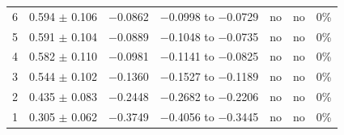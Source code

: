 \begin{table}[t]
\begin{tabular}{rcccccc}
6 & 0.594 $\pm$ 0.106 & $-$0.0862 & $-$0.0998 to $-$0.0729 & no & no & 0\% \\
5 & 0.591 $\pm$ 0.104 & $-$0.0889 & $-$0.1048 to $-$0.0735 & no & no & 0\% \\
4 & 0.582 $\pm$ 0.110 & $-$0.0981 & $-$0.1141 to $-$0.0825 & no & no & 0\% \\
3 & 0.544 $\pm$ 0.102 & $-$0.1360 & $-$0.1527 to $-$0.1189 & no & no & 0\% \\
2 & 0.435 $\pm$ 0.083 & $-$0.2448 & $-$0.2682 to $-$0.2206 & no & no & 0\% \\
1 & 0.305 $\pm$ 0.062 & $-$0.3749 & $-$0.4056 to $-$0.3445 & no & no & 0\% \\
\bottomrule
\end{tabular}
\par\smallskip\parbox{0.95\linewidth}{\footnotesize {}}
\end{table}

